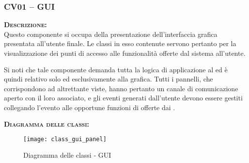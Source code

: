\subsubsection{CV01 -- GUI}\label{sec:cv01}
\begin{description}
	\item{\scshape\bfseries Descrizione:}\\
Questo componente si occupa della presentazione dell'interfaccia grafica presentata all'utente finale. Le classi in esso contenute servono pertanto per la visualizzazione dei punti di accesso alle funzionalità offerte dal sistema all'utente.

Si noti che tale componente demanda tutta la logica di applicazione al  ed è quindi relativo solo ed esclusivamente alla grafica. Tutti i pannelli, che corrispondono ad altrettante viste, hanno pertanto un canale di comunicazione aperto con il  loro associato, e gli eventi generati dall'utente devono essere gestiti collegando l'evento alle opportune funzioni di  offerte dai .

	\item{\scshape\bfseries Diagramma delle classi:}
  \begin{figure}[H]
    \centering
    
   \texttt{[image: class\_gui\_panel]}
    \caption{Diagramma delle classi - GUI}\label{fig:gui}
  \end{figure}


\end{description}
